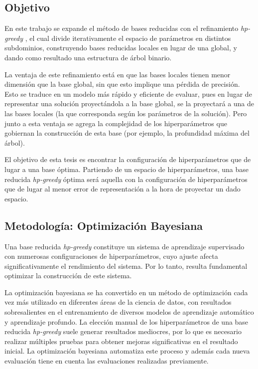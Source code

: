 \subsection*{Objetivo}

En este trabajo se expande el método de bases reducidas con el refinamiento \textit{hp-greedy} \cite{Cerino:2022dhr}, el cual divide iterativamente el espacio de parámetros en distintos subdominios, construyendo bases reducidas locales en lugar de una global, y dando como resultado una estructura de árbol binario.

La ventaja de este refinamiento está en que las bases locales tienen menor dimensión que la base global, sin que esto implique una pérdida de precisión. Esto se traduce en un modelo más rápido y eficiente de evaluar, pues en lugar de representar una solución proyectándola a la base global, se la proyectará a una de las bases locales (la que corresponda según los parámetros de la solución). 
Pero junto a esta ventaja se agrega la complejidad de los hiperparámetros que gobiernan la construcción de esta base (por ejemplo, la profundidad máxima del árbol).


El objetivo de esta tesis es encontrar la configuración de hiperparámetros que de lugar a una base óptima. Partiendo de un espacio de hiperparámetros, una base reducida \textit{hp-greedy} óptima será aquella con la configuración de hiperparámetros que de lugar al menor error de representación a la hora de proyectar un dado espacio. 


\subsection*{Metodología: Optimización Bayesiana}

Una base reducida \textit{hp-greedy} constituye un sistema de aprendizaje supervisado con numerosas configuraciones de hiperparámetros, cuyo ajuste afecta significativamente el rendimiento del sistema. Por lo tanto, resulta fundamental optimizar la construcción de este sistema.

La optimización bayesiana \cite{7352306, https://doi.org/10.48550/arxiv.1012.2599} se ha convertido en un método de optimización cada vez más utilizado en diferentes áreas de la ciencia de datos, con resultados sobresalientes en el entrenamiento de diversos modelos de aprendizaje automático y aprendizaje profundo. La elección manual de los hiperparámetros de una base reducida \textit{hp-greedy} suele generar resultados mediocres, por lo que es necesario realizar múltiples pruebas para obtener mejoras significativas en el resultado inicial. La optimización bayesiana automatiza este proceso y además cada nueva evaluación tiene en cuenta las evaluaciones realizadas previamente. 

